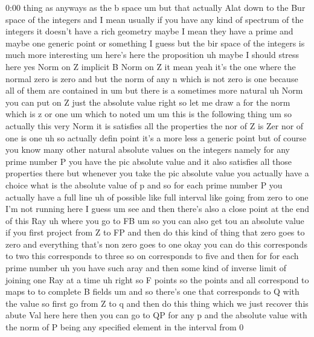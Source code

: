 \begin{unfinished}{0:00}
thing  as  anyways  as  the  b  space
um  but  that  actually  Alat  down  to  the
Bur  space  of  the
integers  and  I  mean  usually  if  you  have
any  kind  of  spectrum  of  the
integers  it  doesn't  have  a  rich  geometry
maybe  I  mean  they  have  a  prime  and  maybe
one  generic  point  or  something  I  guess
but  the  bir  space  of  the  integers  is
much  more
interesting
um  here's  here  the
proposition  uh  maybe  I  should  stress
here
yes  Norm  on  Z
implicit  B  Norm  on  Z  it  mean  yeah  it's
the  one  where  the  normal
zero  is  zero  and  but  the  norm  of  any  n
which  is  not  zero  is  one
because  all  of  them  are  contained
in  um  but  there  is  a  sometimes  more
natural  uh  Norm  you  can  put  on  Z  just
the  absolute
value  right  so  let  me  draw
a
for  the  norm  which  is  z  or
one  um  which  to  noted
um  um  this  is  the  following  thing
um  so  actually  this  very  Norm  it  is
satisfies  all  the  properties  the  nor  of
Z  is  Zer  nor  of  one  is
one  uh  so  actually  defin  point  it's  a
more  less  a  generic
point  but  of  course  you  know  many  other
natural  absolute  values  on  the  integers
namely  for  any  prime  number  P  you  have
the  pic  absolute  value  and  it  also
satisfies  all  those  properties
there  but  whenever  you  take  the  pic
absolute  value  you  actually  have  a
choice  what  is  the  absolute  value  of  p
and  so  for  each  prime  number  P  you
actually  have  a  full  line  uh  of  possible
like  full  interval  like  going  from  zero
to
one
I'm  not  running  here  I  guess  um
see  and  then  there's  also  a  close  point
at  the  end  of  this  Ray  uh  where  you  go
to  FB  um  so  you  can  also  get  tou  an
absolute  value  if  you  first  project  from
Z  to  FP  and  then  do  this  kind  of  thing
that  zero  goes  to  zero  and  everything
that's  non  zero  goes  to
one
okay  you  can  do  this  corresponds  to  two
this  corresponds  to  three  so  on
corresponds  to  five  and  then  for  for
each  prime  number  uh  you  have  such  aray
and  then  some  kind  of  inverse  limit  of
joining  one  Ray  at  a
time  uh  right  so  F
points
so  the  points  and  all  correspond  to  maps
to
to  complete  B  fields  um  and  so  there's
one  that  corresponds  to  Q  with  the
value  so  first  go  from  Z  to  q  and  then
do  this  thing  which  we  just  recover  this
abute
Val  here
here
then  you  can  go  to  QP  for  any  p  and  the
absolute
value  with  the  norm  of  P  being  any
specified  element  in  the  interval  from  0

\end{unfinished}
